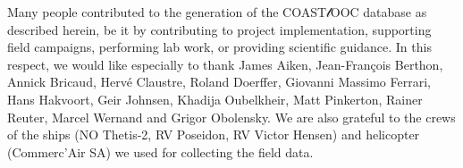\documentclass[essd, manuscript]{copernicus}
\begin{document}
\appendixtables   %






\begin{acknowledgements}
    Many people contributed to the generation of the COAST$\mathscr{l}$OOC database as described herein, be it by contributing to project implementation, supporting field campaigns, performing lab work, or providing scientific guidance. In this respect, we would like especially to thank James Aiken, Jean-François Berthon, Annick Bricaud, Hervé Claustre, Roland Doerffer, Giovanni Massimo Ferrari, Hans Hakvoort, Geir Johnsen, Khadija Oubelkheir, Matt Pinkerton, Rainer Reuter, Marcel Wernand and Grigor Obolensky. We are also grateful to the crews of the ships (NO Thetis-2, RV Poseidon, RV Victor Hensen) and helicopter (Commerc'Air SA) we used for collecting the field data.
\end{acknowledgements}





\end{document}
